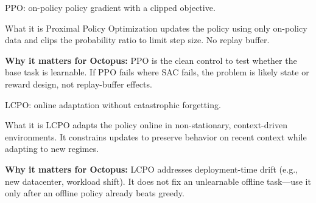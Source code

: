\documentclass[11pt,aspectratio=43]{beamer}
\begin{document}
\begin{frame}{PPO: on-policy policy gradient with a clipped objective.}
  \begin{block}{What it is}
    Proximal Policy Optimization \cite{schulman2017ppo} updates the policy using only on-policy data and clips the probability ratio to limit step size. No replay buffer.
  \end{block}
  \vspace{0.4em}
  \textbf{Why it matters for Octopus:} PPO is the clean control to test whether the base task is learnable. If PPO fails where SAC fails, the problem is likely state or reward design, not replay-buffer effects.
\end{frame}

\begin{frame}{LCPO: online adaptation without catastrophic forgetting.}
  \begin{block}{What it is}
    LCPO \cite{hamadanian2025lcpo} adapts the policy online in non-stationary, context-driven environments. It constrains updates to preserve behavior on recent context while adapting to new regimes.
  \end{block}
  \vspace{0.4em}
  \textbf{Why it matters for Octopus:} LCPO addresses deployment-time drift (e.g., new datacenter, workload shift). It does not fix an unlearnable offline task---use it only after an offline policy already beats greedy.
\end{frame}
\end{document}
